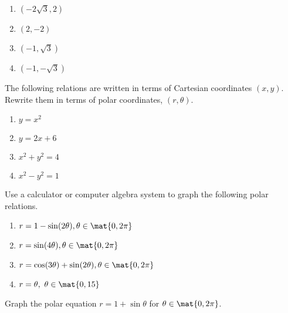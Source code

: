 \begin{enumialphparenastyle}
\begin{ex}
\begin{enumerate}
\item $(-2\sqrt{3},2) $

\item $(2,-2) $

\item $(-1,\sqrt{3}) $

\item $(-1,-\sqrt{3}) $
\end{enumerate}
\end{ex}

\begin{ex} The following relations are written in terms of Cartesian coordinates $(x, y)$. Rewrite them in terms of polar coordinates, $(r, \theta)$. 

\begin{enumerate}
\item $y=x^{2}$

\item $y=2x+6$

\item $x^{2}+y^{2}=4$

\item $x^{2}-y^{2}=1$
\end{enumerate}
\end{ex}

\begin{ex} Use a calculator or computer algebra system to graph the following
polar relations.

\begin{enumerate}
\item $r=1-\sin (2\theta) ,\theta \in \mat{0,2\pi} $

\item $r=\sin (4\theta) ,\theta \in \mat{0,2\pi} $ 

\item $r=\cos (3\theta) +\sin (2\theta) ,\theta
\in \mat{0,2\pi} $

\item $r=\theta ,\ \theta \in \mat{0,15} $
\end{enumerate}
\end{ex}

\begin{ex} Graph the polar equation $r=1+\sin \theta $ for $\theta \in \mat{0,2\pi}$.
\end{ex}


\end{enumialphparenastyle}
